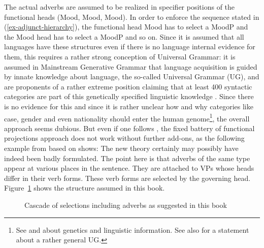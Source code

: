 The actual adverbs are assumed to be realized in specifier positions of the functional heads
(Mood, Mood, Mood).
In order to enforce the sequence stated in (\ref{ex-adjunct-hierarchy}), the functional head Mood has to select a MoodP and
the Mood head has to select a MoodP and so on. 
%
Since it is assumed that all languages have these structures even if there is no language internal
evidence for them, this requires a rather strong conception of Universal
Grammar: it is assumed in Mainstream Generative Grammar that language acquisition is guided by
innate knowledge about language, the so-called Universal Grammar (UG), and \citet{CR2010a} are proponents of a rather extreme position
claiming that at least 400 syntactic categories are part of this genetically specified linguistic
knowledge \citep[]{CR2010a}. Since there is no evidence for this and since it is rather unclear how and why categories
like case, gender and even nationality \parencites[, 99, 100]{Cinque94a-u}[114]{Scott2002a-u} should enter the human genome\footnote{
  See \citet{Bishop2002a} and \citet*{EBJKSPP96a} about genetics and linguistic information. See
  also \citet*{HCF2002a} for a statement about a rather general UG.
}, the overall approach seems
dubious. But even if one follows \citeauthor{CR2010a}, the fixed battery of functional projections
approach does not work without further add-ons, as the following example from
\citet[]{Haider2022a} based on  shows:
\largerpage
\eanoraggedright
The new theory certainly may possibly have indeed been badly formulated.
\z
The point here is that adverbs of the same type appear at various places in the sentence. They are
attached to VPs whose heads differ in their verb forms. These verb forms are selected by the governing
head. Figure~\ref{fig-verbal-selection} shows the structure assumed in this book.
\begin{figure}
\caption{Cascade of selections including adverbs as suggested in this book}\label{fig-verbal-selection}
\end{figure}
